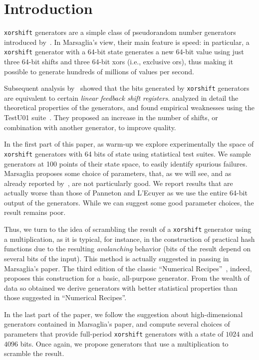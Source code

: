 \documentclass{acmsmalltr}
\newcommand{\xorshift}[1][]{\texttt{xorshift#1}\xspace}
\begin{document}
\section{Introduction}

\xorshift generators are a simple class of pseudorandom number generators
introduced by~. In Marsaglia's view, their main feature is
speed: in particular, a \xorshift generator with a 64-bit state
generates a new 64-bit value using just three 64-bit shifts and three 64-bit xors (i.e., exclusive ors), thus
making it possible to generate hundreds of millions of values per
second.

Subsequent analysis by~ showed that the bits generated by
\xorshift generators are equivalent to certain \emph{linear feedback shift registers}.
 analyzed in detail the theoretical properties of the generators,
and found empirical weaknesses using the TestU01 suite~\cite{LESTU01}. They
proposed an increase in the number of shifts, or combination with another generator, to improve quality.

In the first part of this paper, as warm-up we explore experimentally 
the space of \xorshift generators with 64 bits of state using statistical test suites. We sample
generators at 100 points of their state space, to easily identify spurious failures.
Marsaglia proposes some choice of parameters, that, as we
will see, and as already reported by~, are not particularly good.
We report results that are actually worse than those of Panneton and L'Ecuyer as
we use the entire 64-bit output of the generators.
While we can suggest some good parameter choices, the result remains poor.

Thus, we turn to the idea of scrambling the result of a \xorshift generator
using a multiplication, as it is typical, for instance, in the construction of
practical hash functions due to the resulting \emph{avalanching} behavior (bits
of the result depend on several bits of the input). This method 
is actually suggested in passing in Marsaglia's paper.
The third edition of the classic ``Numerical Recipes''~\cite{PTVNR}, indeed,
proposes this construction for a basic, all-purpose generator.
From the wealth of data so obtained we derive generators with 
better statistical properties than those suggested in ``Numerical Recipes''.

In the last part of the paper, we follow the suggestion about high-dimensional
generators contained in Marsaglia's paper, and compute 
several choices of parameters that provide full-period \xorshift generators with a state of $1024$
and $4096$ bits. Once again, we propose generators that use a multiplication
to scramble the result.
\end{document}
